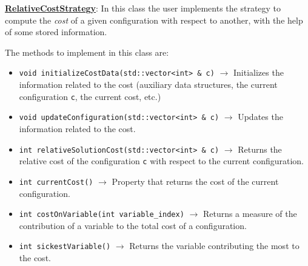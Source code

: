 \underline{\textbf{RelativeCostStrategy}}: In this class the user implements the strategy to compute the \textit{cost} of a given configuration with respect to another, with the help of some stored information.


The methods to implement in this class are:

\begin{itemize}
\item \verb!void initializeCostData(std::vector<int> & c)! $\rightarrow$ Initializes the information related to the cost (auxiliary data structures, the current configuration \verb!c!, the current cost, etc.)
\item \verb!void updateConfiguration(std::vector<int> & c)! $\rightarrow$ Updates the information related to the cost.
\item \verb!int relativeSolutionCost(std::vector<int> & c)! $\rightarrow$ Returns the relative cost of the configuration \verb!c! with respect to the current configuration.
\item \verb!int currentCost()! $\rightarrow$ Property that returns the cost of the current configuration.
\item \verb!int costOnVariable(int variable_index)! $\rightarrow$ Returns a measure of the contribution of a variable to the total cost of a configuration. %
\item \verb!int sickestVariable()! $\rightarrow$ Returns the variable contributing the most to the cost.
\end{itemize}

